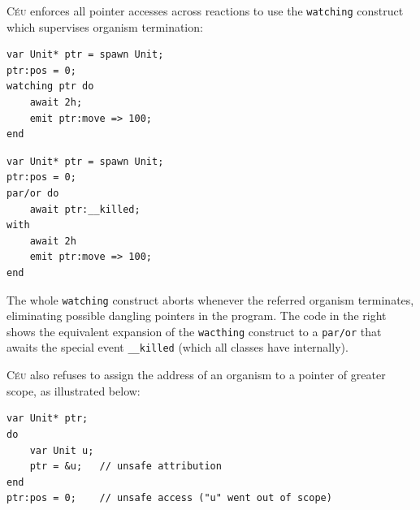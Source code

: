 \documentclass{acm_proc_article-sp}
\newcommand{\CEU}{\textsc{C\'{e}u}\xspace}
\newcommand{\code}[1] {{\small{\texttt{#1}}}}
\newcommand{\1}{\;}
\newcommand{\2}{\;\;}
\newcommand{\3}{\;\;\;}
\newcommand{\5}{\;\;\;\;\;}
\begin{document}
\CEU enforces all pointer accesses across reactions to use the \code{watching} 
construct which supervises organism termination:

\begin{minipage}[t]{0.48\linewidth}
\begin{lstlisting}
var Unit* ptr = spawn Unit;
ptr:pos = 0;
watching ptr do
    await 2h;
    emit ptr:move => 100;
end
\end{lstlisting}
\end{minipage}
%
\begin{minipage}[t]{0.48\linewidth}
\begin{lstlisting}
var Unit* ptr = spawn Unit;
ptr:pos = 0;
par/or do
    await ptr:__killed;
with
    await 2h
    emit ptr:move => 100;
end
\end{lstlisting}
\end{minipage}

The whole \code{watching} construct aborts whenever the referred organism 
terminates, eliminating possible dangling pointers in the program.
%
The code in the right shows the equivalent expansion of the \code{wacthing} 
construct to a \code{par/or} that awaits the special event \code{\_\_killed} 
(which all classes have internally).

\CEU also refuses to assign the address of an organism to a pointer of greater 
scope, as illustrated below:

\begin{lstlisting}
var Unit* ptr;
do
    var Unit u;
    ptr = &u;   // unsafe attribution
end
ptr:pos = 0;    // unsafe access ("u" went out of scope)
\end{lstlisting}

\end{document}
